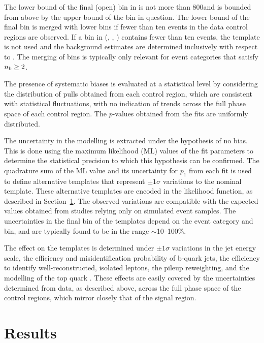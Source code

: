The lower bound of the final (open) bin in \HTmiss is not more than
800\GeV and is bounded from above by the upper bound of the \scalht
bin in question. The lower bound of the final \HTmiss bin is merged
with lower bins if fewer than ten events in the data control regions
are observed. If a bin in (\njet, \nb, \scalht) contains fewer than
ten events, the \HTmiss template is not used and the background
estimates are determined inclusively with respect to \HTmiss. The
merging of bins is typically only relevant for event categories that
satisfy $n_{\text{b}} \geq 2$.

The presence of systematic biases is evaluated at a statistical level
by considering the distribution of pulls obtained from each control
region, which are consistent with statistical fluctuations, with no
indication of trends across the full phase space of each control
region. The $p$-values obtained from the fits are uniformly
distributed.

The uncertainty in the \HTmiss modelling is extracted under the
hypothesis of no bias. This is done using the maximum likelihood (ML)
values of the fit parameters to determine the statistical precision to
which this hypothesis can be confirmed. The quadrature sum of the ML
value and its uncertainty for $p_1$ from each fit is used to define
alternative templates that represent $\pm1\sigma$ variations to the
nominal \HTmiss template. These alternative templates are encoded in
the likelihood function, as described in Section~\ref{sec:result}. The
observed variations are compatible with the expected values obtained
from studies relying only on simulated event samples. The
uncertainties in the final \HTmiss bin of the templates depend on the
event category and \scalht bin, and are typically found to be in the
range $\sim$10--100\%.

The effect on the \HTmiss templates is determined under $\pm1\sigma$
variations in the jet energy scale, the efficiency and
misidentification probability of b-quark jets, the efficiency to
identify well-reconstructed, isolated leptons, the pileup reweighting,
and the modelling of the top quark \pt. These effects
are easily covered by the uncertainties determined from data, as
described above, across the full phase space of the control regions,
which mirror closely that of the signal region.

\section{Results}
\label{sec:result}

